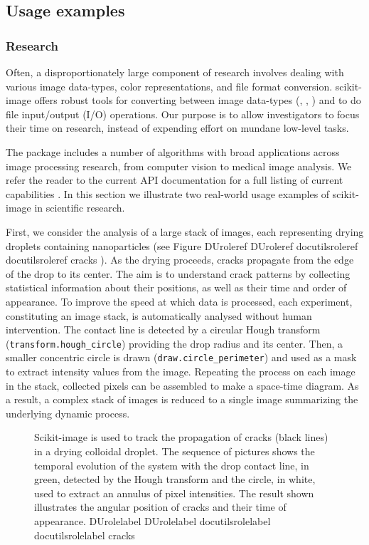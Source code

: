 \documentclass[letterpaper,compsoc,twoside]{IEEEtran}
\providecommand*{\DUrole}[2]{%
  \ifcsname DUrole#1\endcsname%
    \csname DUrole#1\endcsname{#2}%
  \else%
    \ifcsname docutilsrole#1\endcsname%
      \csname docutilsrole#1\endcsname{#2}%
    \else%
      #2%
    \fi%
  \fi%
}
\begin{document}
\subsection{Usage examples%
  \label{usage-examples}%
}


\subsubsection{Research%
  \label{research}%
}


Often, a disproportionately large component of research involves dealing with
various image data-types, color representations, and file format
conversion. scikit-image offers robust tools for converting between image
data-types (\cite{DirectX}, \cite{OpenGL}, \cite{GraphicsGemsI}) and to do file input/output
(I/O) operations.  Our purpose is to allow investigators to focus their time on
research, instead of expending effort on mundane low-level tasks.

The package includes a number of algorithms with broad applications across
image processing research, from computer vision to medical image analysis. We
refer the reader to the current API documentation for a full listing of current
capabilities \cite{APIdocs}. In this section we illustrate two real-world usage
examples of scikit-image in scientific research.

First, we consider the analysis of a large stack of images, each representing
drying droplets containing nanoparticles (see Figure \DUrole{ref}{cracks}). As the drying proceeds,
cracks propagate from the edge of the drop to its center. The aim is to understand
crack patterns by collecting statistical information about their positions,
as well as their time and order of appearance. To improve the speed at which
data is processed,
each experiment, constituting an image stack, is automatically analysed without
human intervention. The contact line is detected by a circular Hough transform
(\texttt{transform.hough\_circle}) providing the drop radius and its center. Then, a
smaller concentric circle is drawn (\texttt{draw.circle\_perimeter}) and used as
a mask to extract intensity values from the image.
Repeating the process on each image in the stack, collected
pixels can be assembled to make a space-time diagram. As a result, a complex
stack of images is reduced to a single image summarizing the underlying dynamic
process.\begin{figure}[bht]\noindent{}
\caption{Scikit-image is used to track the propagation of cracks (black lines)
in a drying colloidal droplet. The sequence of pictures shows the temporal
evolution of the system with the drop contact line, in green, detected by the
Hough transform and the circle, in white, used to extract an annulus of
pixel intensities.  The result shown illustrates the angular position of
cracks and their time of appearance. \DUrole{label}{cracks}}
\end{figure}
\end{document}
